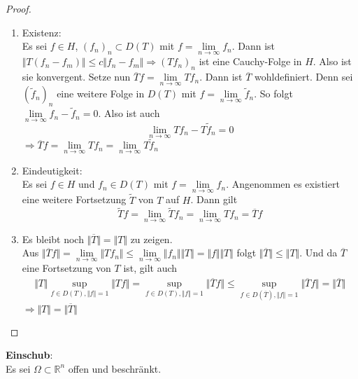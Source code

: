 \documentclass[12pt,titlepage]{article}
\numberwithin{equation}{section}
\begin{document}
\begin{proof}
\begin{enumerate}
\item Existenz:\\
 Es sei $f \in H$, $(f_n)_n\subset D(T)$ mit $f=\underset{n \rightarrow \infty}{\lim}f_n.$ Dann ist $\Vert T(f_n-f_m)\Vert \leq c \Vert f_n-f_m\Vert\Rightarrow (Tf_n)_n $ ist eine Cauchy-Folge in $H$. Also ist sie konvergent. Setze nun $\overline{T}f=\underset{n \rightarrow \infty}{\lim}Tf_n.$ Dann ist $\overline{T}$ wohldefiniert. Denn sei $(\tilde{f}_n)_n$ eine weitere Folge in $D(T)$ mit $f=\underset{n \rightarrow \infty}{\lim}\tilde{f}_n.$ So folgt $\underset{n \rightarrow \infty}{\lim}f_n-\tilde{f}_n=0.$
Also ist auch 
\[
\underset{n \rightarrow \infty}{\lim}Tf_n-T\tilde{f}_n=0
\]
$\Rightarrow \overline{T}f=\underset{n \rightarrow \infty}{\lim}Tf_n=\underset{n \rightarrow \infty}{\lim}T\tilde{f}_n$
\item Eindeutigkeit:\\
Es sei $f\in H$ und $f_n\in D(T)$ mit $f=\underset{n \rightarrow \infty}{\lim}f_n.$ Angenommen es existiert eine weitere Fortsetzung $\tilde{T}$ von $T$ auf $H$. Dann gilt
\[
\tilde{T}f=\underset{n \rightarrow \infty}{\lim}\tilde{T}f_n=\underset{n \rightarrow \infty}{\lim}Tf_n=\overline{T}f
\]
\item Es bleibt noch $\Vert \overline{T}\Vert =\Vert T \Vert $ zu zeigen. \\
Aus $\Vert \overline{T}f\Vert =\underset{n \rightarrow \infty}{\lim}\Vert Tf_n\Vert \leq \underset{n \rightarrow \infty}{\lim}\Vert f_n \Vert \Vert T \Vert =\Vert f \Vert \Vert T \Vert$ folgt $\Vert \overline{T}\Vert\leq \Vert T \Vert . $ Und da $\overline{T}$ eine Fortsetzung von $T$ ist, gilt auch 
\begin{align*}
\Vert T \Vert \underset{f\in D(T),\Vert f \Vert =1}{\sup}\Vert Tf \Vert =\underset{f\in D(T),\Vert f \Vert =1}{\sup}\Vert \overline{T}f \Vert \leq\underset{f\in D(\overline{T}),\Vert f \Vert =1}{\sup}\Vert \overline{T}f \Vert =\Vert \overline{T} \Vert
\end{align*}
$\Rightarrow \Vert T \Vert =\Vert \overline{T}\Vert $
\end{enumerate}
\end{proof}
\textbf{Einschub}:\\
Es sei $\Omega \subset \mathbb{R}^n$ offen und beschränkt.
\end{document}
